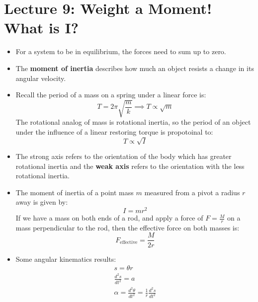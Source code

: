 \section{Lecture 9: Weight a Moment! What is I?}
\begin{itemize}
    \item For a system to be in equilibrium, the forces need to sum up to zero.
    \item The \textbf{moment of inertia} describes how much an object resists a change in its angular velocity.
    \item Recall the period of a mass on a spring under a linear force is:
    \begin{equation}
        T = 2\pi\sqrt{\frac{m}{k}} \implies T \propto \sqrt{m}
        \label{eq:}
    \end{equation}
    The rotational analog of mass is rotational inertia, so the period of an object under the influence of a linear restoring torque is propotoinal to:
    \begin{equation}
        T \propto \sqrt{I}
        \label{eq:}
    \end{equation}
    \item The strong axis refers to the orientation of the body which has greater rotational inertia and the \textbf{weak axis} refers to the orientation with the less rotational inertia.
    \item The moment of inertia of a point mass $m$ measured from a pivot a radius $r$ away is given by:
    \begin{equation}
        I = mr^2
        \label{eq:}
    \end{equation}
    If we have a mass on both ends of a rod, and apply a force of $F=\frac{M}{r}$ on a mass perpendicular to the rod, then the effective force on both masses is:
    \begin{equation}
        F_\text{effective} = \frac{M}{2r}
        \label{eq:}
    \end{equation}
    \item Some angular kinematics results:
    \begin{align}
        s = \theta r \\ 
        \frac{d^2s}{dt^2}=a \\ 
        \alpha = \frac{d^2\theta}{dt^2}=\frac{1}{r}\frac{d^2s}{dt^2}
    \end{align}
\end{itemize}